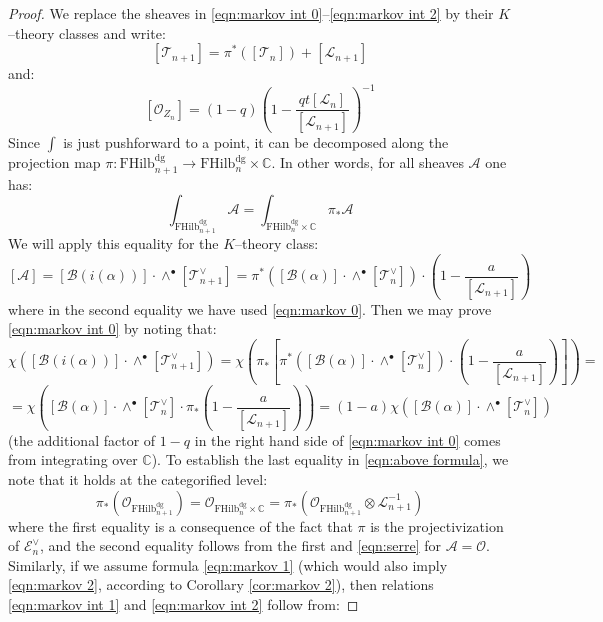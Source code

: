 \documentclass[12pt]{amsart}
\numberwithin{equation}{section}
\theoremstyle{definition}
\theoremstyle{remark}
\newcommand{\CC}{\mathbb{C}}
\newcommand{\CB}{\mathcal{B}}
\newcommand{\CA}{\mathcal{A}}
\newcommand{\CE}{\mathcal{E}}
\newcommand{\CL}{\mathcal{L}}
\newcommand{\CO}{\mathcal{O}}
\newcommand{\CT}{\mathcal{T}}
\renewcommand{\1}{\mathbf{1}}
\newcommand{\FH}{\mathrm{FHilb}}
\newcommand{\dg}{\text{dg}}%
\begin{document}
\begin{proof} 
We replace the sheaves in \eqref{eqn:markov int 0}--\eqref{eqn:markov int 2} by their $K$--theory classes and write:
$$
[\CT_{n+1}] = \pi^*\left(  [\CT_n] \right) + [\CL_{n+1}]
$$
and:
\begin{equation}
\label{eqn:k-theory zn}
[\CO_{Z_n}] = (1-q) \left(1-\frac {qt[\CL_n]}{[\CL_{n+1}]} \right)^{-1}
\end{equation}
Since $\int$ is just pushforward to a point, it can be decomposed along the projection map $\pi: \FH_{n+1}^\dg \rightarrow \FH_n^\dg \times \CC$. In other words, for all sheaves $\CA$ one has:
$$
\int_{\FH_{n+1}^\dg} \CA = \int_{\FH_{n}^\dg\times \CC}\pi_*\CA
$$
We will apply this equality for the $K$--theory class: 
$$
[\CA] = [\CB(i(\alpha))] \cdot \wedge^\bullet [\CT_{n+1}^\vee] = \pi^*\left( [\CB(\alpha)] \cdot  \wedge^\bullet [\CT_{n}^\vee] \right) \cdot \left(1- \frac a{[\CL_{n+1}]} \right)
$$
where in the second equality we have used \eqref{eqn:markov 0}. Then we may prove \eqref{eqn:markov int 0} by noting that:
$$
\chi \left( 
[\CB(i(\alpha))] \cdot \wedge^\bullet [\CT_{n+1}^\vee] \right)= \chi \left(  
 \pi_* \left[ \pi^*\left( [\CB(\alpha)] \cdot \wedge^\bullet [\CT_{n}^\vee] \right) \cdot \left(1- \frac a{[\CL_{n+1}]} \right) \right] \right)= 
$$
\begin{equation}
\label{eqn:above formula}
= \chi \left( 
[\CB(\alpha)] \cdot \wedge^\bullet [\CT_{n}^\vee] \cdot \pi_*\left(1- \frac a{[\CL_{n+1}]} \right) \right)= (1-a) \chi \left( 
[\CB(\alpha)] \cdot \wedge^\bullet [\CT_{n}^\vee]\right)
\end{equation}
(the additional factor of $1-q$ in the right hand side of \eqref{eqn:markov int 0} comes from integrating over $\CC$). To establish the last equality in \eqref{eqn:above formula}, we note that it holds at the categorified level:
\begin{equation}
\label{eqn:f1}
\pi_*\left(\CO_{\FH_{n+1}^\dg} \right) = \CO_{\FH_{n}^\dg \times \CC} = \pi_* \left(\CO_{\FH_{n+1}^\dg} \otimes \CL_{n+1}^{-1}  \right)
\end{equation}
where the first equality is a consequence of the fact that $\pi$ is the projectivization of $\CE^\vee_n$, and the second equality follows from the first and \eqref{eqn:serre} for $\CA = \CO$. Similarly, if we assume formula \eqref{eqn:markov 1} (which would also imply \eqref{eqn:markov 2}, according to Corollary \ref{cor:markov 2}), then relations \eqref{eqn:markov int 1} and \eqref{eqn:markov int 2} follow from:

\end{proof}
\end{document}
